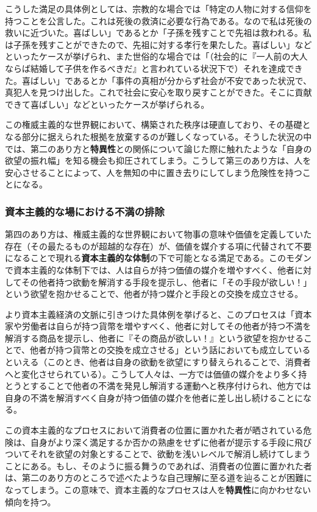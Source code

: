こうした満足の具体例としては、宗教的な場合では「特定の人物に対する信仰を持つことを公言した。これは死後の救済に必要な行為である。なので私は死後の救いに近づいた。喜ばしい」であるとか「子孫を残すことで先祖は救われる。私は子孫を残すことができたので、先祖に対する孝行を果たした。喜ばしい」などといったケースが挙げられ、また世俗的な場合では「（社会的に『一人前の大人ならば結婚して子供を作るべきだ』と言われている状況下で）それを達成できた。喜ばしい」であるとか「事件の真相が分からず社会が不安であった状況で、真犯人を見つけ出した。これで社会に安心を取り戻すことができた。そこに貢献できて喜ばしい」などといったケースが挙げられる。

この権威主義的な世界観において、構築された秩序は硬直しており、その基礎となる部分に据えられた根拠を放棄するのが難しくなっている。そうした状況の中では、第二のあり方と\textbf{特異性}との関係について論じた際に触れたような「自身の欲望の振れ幅」を知る機会も抑圧されてしまう。こうして第三のあり方は、人を安心させることによって、人を無知の中に置き去りにしてしまう危険性を持つことになる。

\subsubsection{資本主義的な場における不満の排除}\label{ux8cc7ux672cux4e3bux7fa9ux7684ux306aux5834ux306bux304aux3051ux308bux4e0dux6e80ux306eux6392ux9664}

第四のあり方は、権威主義的な世界観において物事の意味や価値を定義していた存在（その最たるものが超越的な存在）が、価値を媒介する項に代替されて不要になることで現れる\textbf{資本主義的な体制}の下で可能となる満足である。このモダンで資本主義的な体制下では、人は自らが持つ価値の媒介を増やすべく、他者に対してその他者持つ欲動を解消する手段を提示し、他者に「その手段が欲しい！」という欲望を抱かせることで、他者が持つ媒介と手段との交換を成立させる。

より資本主義経済の文脈に引きつけた具体例を挙げると、このプロセスは「資本家や労働者は自らが持つ貨幣を増やすべく、他者に対してその他者が持つ不満を解消する商品を提示し、他者に『その商品が欲しい！』という欲望を抱かせることで、他者が持つ貨幣との交換を成立させる」という話においても成立しているといえる（このとき、他者は自身の欲動を欲望にすり替えられることで、消費者へと変化させられている）。こうして人々は、一方では価値の媒介をより多く持とうとすることで他者の不満を発見し解消する運動へと秩序付けられ、他方では自身の不満を解消すべく自身が持つ価値の媒介を他者に差し出し続けることになる。

この資本主義的なプロセスにおいて消費者の位置に置かれた者が晒されている危険は、自身がより深く満足するか否かの熟慮をせずに他者が提示する手段に飛びついてそれを欲望の対象とすることで、欲動を浅いレベルで解消し続けてしまうことにある。もし、そのように振る舞うのであれば、消費者の位置に置かれた者は、第二のあり方のところで述べたような自己理解に至る道を辿ることが困難になってしまう。この意味で、資本主義的なプロセスは人を\textbf{特異性}に向かわせない傾向を持つ。

